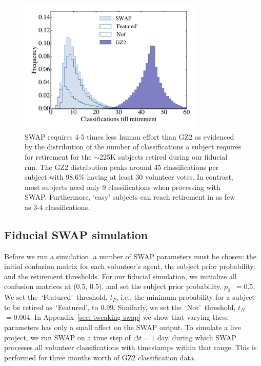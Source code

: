 \documentclass[twocolumn]{aastex6}
\newcommand{\p}{$p_0$}
\newcommand{\tf}{$t_F$}
\newcommand{\tn}{$t_N$}
\newcommand{\feat}{`Featured'}
\newcommand{\notfeat}{`Not'}
\begin{document}
\begin{figure}[t!] 
\centering
\includegraphics[width=3.5in]{figures/GZX_clicks_till_retired_baseline.pdf}
\caption{SWAP requires 4-5 times less human effort than GZ2 as evidenced by the distribution of the number of classifications a subject requires for retirement for the $\sim$225K subjects retired during our fiducial run.  The GZ2 distribution peaks around 45 classifications per subject with 98.6\% having at least 30 volunteer votes. In contrast, most subjects need only 9 classifications when processing with SWAP.  Furthermore,  `easy' subjects can reach retirement in as few as 3-4 classifications. \label{fig: swap vote distributions}}
\end{figure}


\subsection{Fiducial SWAP simulation}\label{sec: fiducial}


Before we run a simulation, a number of SWAP parameters must be chosen: 
 the initial confusion matrix for each volunteer's agent, the subject 
prior probability, and the retirement thresholds. 
For our fiducial  simulation, we initialize all confusion matrices at (0.5, 0.5), 
and set the subject prior probability, \p~$= 0.5$. 
We set the~\feat~threshold, \tf, i.e., the minimum probability for a subject to be retired as~\feat, to $0.99$. Similarly, we set the~\notfeat~threshold, \tn~$= 0.004$. 
In Appendix~\ref{sec: tweaking swap} 
we show that varying these parameters has only a small affect on the SWAP output. 
To simulate a live project, we run SWAP on a time step of $\Delta t = 1$ day, 
during which SWAP processes all volunteer classifications with timestamps 
within that range. This is performed for three months worth of GZ2 classification data. 
\end{document}
